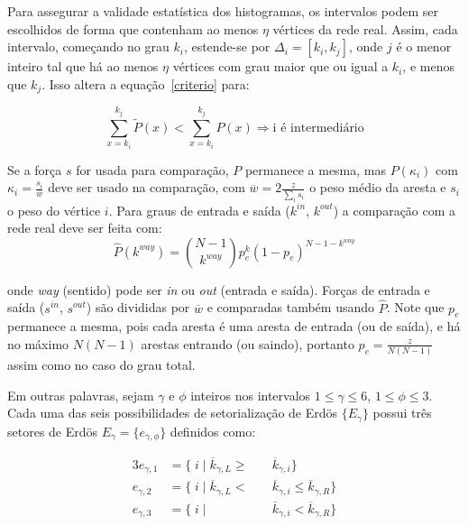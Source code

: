 \documentclass[a4paper,openright,12pt]{report} %
\begin{document}
Para assegurar a validade estatística dos histogramas, os intervalos podem
ser escolhidos de forma que contenham ao menos $\eta$ vértices da rede real.
Assim, cada intervalo, começando no grau $k_i$, estende-se por
$\Delta_i=[k_{i},k_{j}]$,
onde $j$ é o menor inteiro tal que há ao menos $\eta$ vértices com grau maior que ou igual a $k_i$,
e menos que $k_j$. Isso altera a equação~\ref{criterio} para:

\begin{equation}\label{criterio2}
    \sum_{x=k_i}^{k_j} \widetilde{P}(x) < \sum_{x=k_i}^{k_j} P(x) \Rightarrow \text{i é intermediário}
\end{equation}

Se a força $s$ for usada para comparação, $P$ permanece a mesma, mas
$P(\kappa_i)$ com $\kappa_i=\frac{s_i}{\overline{w}}$
deve ser usado na comparação, com
$\overline{w}=2\frac{z}{\sum_is_i}$
o peso médio da aresta e $s_i$ o peso do vértice $i$.
Para graus de entrada e saída
($k^{in}$, $k^{out}$)
a comparação com a rede real deve ser feita com:
\begin{equation}
    \hat{P}(k^{way})=\binom{N-1}{k^{way}}p_e^k(1-p_e)^{N-1-k^{way}}
\end{equation}

\noindent onde \emph{way} (sentido) pode ser \emph{in} ou \emph{out} (entrada e saída).
Forças de entrada e saída ($s^{in}$, $s^{out}$)
são divididas por
$\overline{w}$
e comparadas também usando $\hat{P}$. Note que $p_e$ permanece a mesma,
pois cada aresta é uma aresta de entrada (ou de saída), e há no máximo $N(N-1)$
arestas entrando (ou saindo), portanto
$p_e=\frac{z}{N(N-1)}$
assim como no caso do grau total.

Em outras palavras, sejam $\gamma$ e $\phi$ inteiros nos intervalos
$1 \leq \gamma \leq 6$, $1 \leq \phi \leq 3$.
Cada uma das seis possibilidades de setorialização de Erdös 
$\{E_{\gamma}\}$
possui três setores de Erdös
$E_{\gamma}= \{e_{\gamma, \phi} \}$
definidos como:

\begin{alignat}{3}\label{eq:part}
    e_{\gamma,1}&=\{\;i\;|\;\overline{k}_{\gamma,L}\geq&&\overline{k}_{\gamma,i}\} \nonumber \\
    e_{\gamma,2}&=\{\;i\;|\;\overline{k}_{\gamma,L}<\;&&\overline{k}_{\gamma,i}\leq\overline{k}_{\gamma,R}\} \\ 
    e_{\gamma,3}&=\{\;i\;|\;&&\overline{k}_{\gamma,i}<\overline{k}_{\gamma,R}\} \nonumber
\end{alignat}
\end{document}
